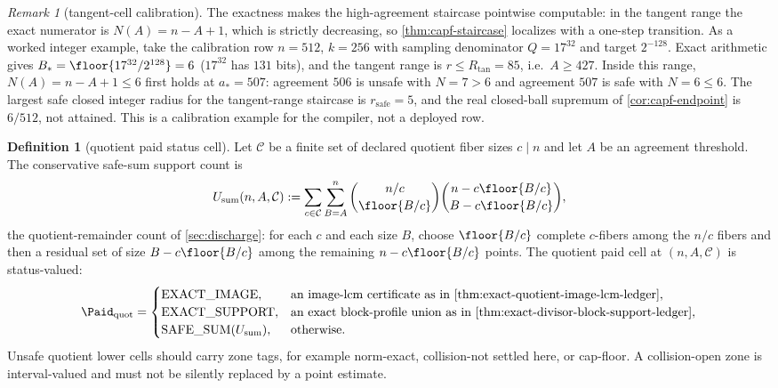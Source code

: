 \documentclass[11pt]{article}
\theoremstyle{definition}
\newtheorem{definition}[definition]{Definition}
\theoremstyle{remark}
\newtheorem{remark}[remark]{Remark}
\begin{document}
\begin{remark}[tangent-cell calibration]\label{rem:capf-tangent-calibration}
The exactness makes the high-agreement staircase pointwise computable: in the tangent range the exact numerator is $N(A)=n-A+1$, which is strictly decreasing, so \cref{thm:capf-staircase} localizes with a one-step transition.  As a worked integer example, take the calibration row $n=512$, $k=256$ with sampling denominator $Q=17^{32}$ and target $2^{-128}$.  Exact arithmetic gives $B_*=\floor{17^{32}/2^{128}}=6$ \textup{($17^{32}$ has $131$ bits)}, and the tangent range is $r\le R_{\tan}=85$, i.e.\ $A\ge427$.  Inside this range, $N(A)=n-A+1\le6$ first holds at $a_*=507$: agreement $506$ is unsafe with $N=7>6$ and agreement $507$ is safe with $N=6\le6$.  The largest safe closed integer radius for the tangent-range staircase is $r_{\mathrm{safe}}=5$, and the real closed-ball supremum of \cref{cor:capf-endpoint} is $6/512$, not attained.  This is a calibration example for the compiler, not a deployed row.
\end{remark}

\begin{definition}[quotient paid status cell]\label{def:capf-quotient-status}
Let $\mathcal C$ be a finite set of declared quotient fiber sizes $c\mid n$ and let $A$ be an agreement threshold.  The conservative safe-sum support count is
\[
U_{\mathrm{sum}}(n,A,\mathcal C):=
\sum_{c\in\mathcal C}\sum_{B=A}^{n}
\binom{n/c}{\floor{B/c}}
\binom{n-c\floor{B/c}}{B-c\floor{B/c}},
\]
the quotient-remainder count of \cref{sec:discharge}: for each $c$ and each size $B$, choose $\floor{B/c}$ complete $c$-fibers among the $n/c$ fibers and then a residual set of size $B-c\floor{B/c}$ among the remaining $n-c\floor{B/c}$ points.  The quotient paid cell at $(n,A,\mathcal C)$ is status-valued:
\[
\Paid_{\mathrm{quot}}=
\begin{cases}
\mathrm{EXACT\_IMAGE}, & \text{an image-lcm certificate as in \cref{thm:exact-quotient-image-lcm-ledger}},\\
\mathrm{EXACT\_SUPPORT}, & \text{an exact block-profile union as in \cref{thm:exact-divisor-block-support-ledger}},\\
\mathrm{SAFE\_SUM}(U_{\mathrm{sum}}), & \text{otherwise}.
\end{cases}
\]
Unsafe quotient lower cells should carry zone tags, for example norm-exact, collision-not settled here, or cap-floor.  A collision-open zone is interval-valued and must not be silently replaced by a point estimate.
\end{definition}
\end{document}
